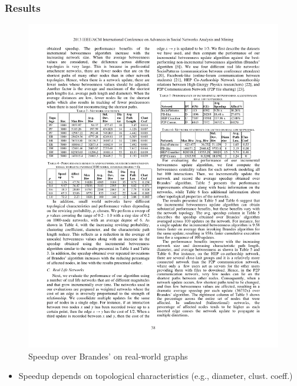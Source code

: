 \begin{frame}
  \frametitle{Results}

  \begin{figure}[t]
    \centering
    \includegraphics[width=\textwidth, height=0.7\textheight, keepaspectratio]{imgs/kas-results1}
    \caption{Speedup over Brandes' on real-world graphs}
  \end{figure}

  \begin{itemize}
    \item Speedup depends on topological characteristics (e.g., diameter, clust. coeff.)
  \end{itemize}
    
\end{frame}


